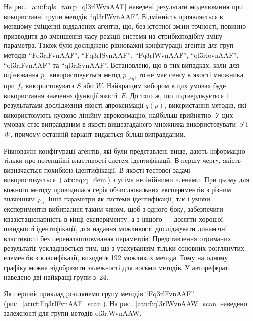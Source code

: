 \documentclass[a4paper,13pt]{atuaref}
\begin{document}
На рис.~\ref{atu:f:qls_ramp_ql3rlWvnAAF} наведені результати моделювання при використанні групи методів
``ql3rlWvnAAF''.
Відмінність проявляється в меншому зміщенні віддалених агентів, що, без
істотної зміни точності, повинно призводити до зменшення часу реакції системи на
стрибкоподібну зміну параметра.
Також було досліджено рівноважні конфігурації агентів для
груп методів
``Fq3rlFvnAAF'',
``Fq3rlSvnAAF'',
``Fq3rlWvnAAF'',
``ql3rlovnAAF'',
``ql3rlFvnAAF'' та
``ql3rlSvnAAF''.
Встановлено, що в тих випадках, коли для оцінювання $p_e$ використовується
метод $p_{eFq}$, то не має сенсу в якості множника при $f_e$
використовувати $S$ або $W$. Найкращим вибором в цих умовах буде
використання значення функції якості~$F$. До того ж, що підтверджується і
результатами дослідження якості апроксимації $q(p)$, використання методів,
які використовують кусково-лінійну апроксимацію, найбільш прийнятно. У цих
умовах стає виправданим в якості вищезгаданого множника використовувати~$S$
і~$W$, причому останній варіант видається більш виправданим.


Рівноважні конфігурації агентів, які були представлені вище, дають інформацію тільки про
потенційні властивості систем ідентифікації. В першу чергу, якість визначається
похибкою ідентифікації. В якості тестової задачі
використовується~(\ref{atu:eq:q_dem}) з усіма нелінійними членами. При цьому для кожного методу
проводилася серія обчислювальних експериментів з різним значенням~$p_o$. Інші
параметри як системи ідентифікації, так і умови експериментів вибиралися таким
чином, щоб з одного боку, забезпечити квазістаціонарність в кінці експерименту, а
з іншого --- досягти хорошої швидкості ідентифікації, для надання можливості
досліджувати динамічні властивості без переналаштовування параметрів.
Представлення отриманих результатів ускладнюється тим, що з урахуванням тільки
основних розглянутих елементів в класифікації, виходить 192 можливих метода.
Тому на одному графіку можна відобразити залежності для восьми методів.
У авторефераті наведено дві найкращі групи з~24.

Як перший приклад розглянемо групу методів
``Fq3rlFvnAAF'' (рис.~\ref{atu:f:Fq3rlFvnAAF_scan}).
На рис.~\ref{atu:f:ql3rlWvnAAW_scan} наведено залежності для групи методів ql3rlWvnAAW.
\end{document}
